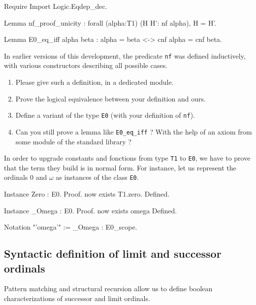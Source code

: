 

\begin{Coqsrc}
Require Import Logic.Eqdep_dec.

Lemma nf_proof_unicity :
  forall (alpha:T1) (H H': nf alpha), H = H'.

Lemma E0_eq_iff alpha beta : alpha = beta <-> cnf alpha = cnf beta.
\end{Coqsrc}

\begin{exercise}
In earlier versions of this development, the predicate \texttt{nf} was defined  inductively, with various constructors describing all possible cases.
\begin{enumerate}
\item Please give such a definition, in a dedicated module.
\item Prove the logical equivalence between your definition and ours.
\item Define a variant of the type \texttt{E0} (with your definition of \texttt{nf}).
\item Can you still prove a lemma like \texttt{E0\_eq\_iff} ? With the help of an axiom from some module of the standard library ?
\end{enumerate}
\end{exercise}


In order to  upgrade constants and fonctions from type \texttt{T1} to \texttt{E0}, we have to prove that 
the term they build is in normal form.
For instance, let us represent the ordinals $0$ and $\omega$ as instances of the class \texttt{E0}.

\label{sect:omega-T1}

\begin{Coqsrc}
Instance Zero : E0.
Proof.
  now exists T1.zero.
Defined.

Instance _Omega : E0.
Proof.  now exists omega%
Defined.

Notation "'omega'"  := _Omega : E0_scope.
\end{Coqsrc}



\subsection{Syntactic definition of limit and successor ordinals}

Pattern matching and structural recursion allow us to define boolean characterizations  of successor and limit ordinals.


